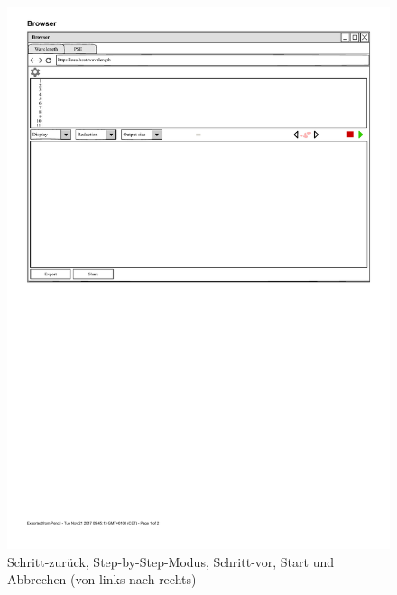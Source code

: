 \documentclass[parskip=full,11pt,twoside]{scrartcl}
\begin{document}
\begin{figure}[H]
	\centering
	\includegraphics{img/actionButton}
	\caption{\label{fig:actionButtons} Schritt-zurück, Step-by-Step-Modus, 
	Schritt-vor, Start und Abbrechen (von links nach rechts)}
\end{figure}
\end{document}
